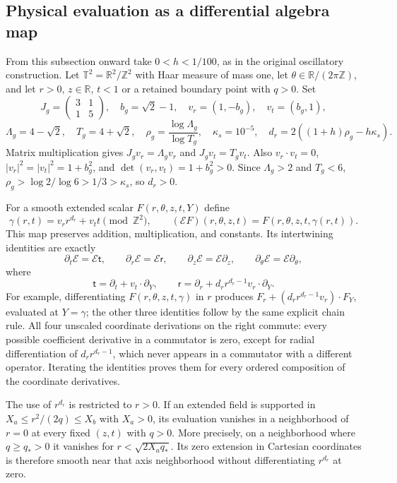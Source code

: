 \documentclass[10pt,a4paper]{article}
\begin{document}
\subsection{Physical evaluation as a differential algebra map}
From this subsection onward take $0<h<1/100$, as in the original
oscillatory construction.
Let $\mathbb T^2=\mathbb R^2/\mathbb Z^2$ with Haar measure of mass one,
let $\theta\in\mathbb R/(2\pi\mathbb Z)$, and let $r>0$, $z\in\mathbb R$,
$t<1$ or a retained boundary point with $q>0$.  Set
\[
 J_g=\begin{pmatrix}3&1\\1&5\end{pmatrix},\quad b_g=\sqrt2-1,
 \quad v_r=(1,-b_g),\quad v_t=(b_g,1),
\]
\[
 \Lambda_g=4-\sqrt2,\quad T_g=4+\sqrt2,
 \quad\rho_g=\frac{\log\Lambda_g}{\log T_g},\quad
 \kappa_s=10^{-5},\quad d_r=2((1+h)\rho_g-h\kappa_s).
\]
Matrix multiplication gives $J_gv_r=\Lambda_gv_r$ and
$J_gv_t=T_gv_t$.  Also
$v_r\cdot v_t=0$, $|v_r|^2=|v_t|^2=1+b_g^2$, and
$\det(v_r,v_t)=1+b_g^2>0$.  Since $\Lambda_g>2$ and $T_g<6$,
$\rho_g>\log2/\log6>1/3>\kappa_s$, so $d_r>0$.

For a smooth extended scalar $F(r,\theta,z,t,Y)$ define
\[
 \gamma(r,t)=v_rr^{d_r}+v_tt\pmod{\mathbb Z^2},\qquad
 (\mathcal EF)(r,\theta,z,t)=F(r,\theta,z,t,\gamma(r,t)).
\]
This map preserves addition, multiplication, and constants.  Its
intertwining identities are exactly
\[
 \partial_t\mathcal E=\mathcal E\mathsf t,\qquad
 \partial_r\mathcal E=\mathcal E\mathsf r,\qquad
 \partial_z\mathcal E=\mathcal E\partial_z,\qquad
 \partial_\theta\mathcal E=\mathcal E\partial_\theta,
\]
where
\[
 \mathsf t=\partial_t+v_t\cdot\partial_Y,\qquad
 \mathsf r=\partial_r+d_rr^{d_r-1}v_r\cdot\partial_Y.
\]
For example, differentiating $F(r,\theta,z,t,\gamma)$ in $r$ produces
$F_r+(d_rr^{d_r-1}v_r)\cdot F_Y$, evaluated at $Y=\gamma$; the other
three identities follow by the same explicit chain rule.  All four
unscaled coordinate derivations on the right commute: every possible
coefficient derivative in a commutator is zero, except for radial
differentiation of $d_rr^{d_r-1}$, which never appears in a commutator
with a different operator.  Iterating the identities proves them for
every ordered composition of the coordinate derivatives.

The use of $r^{d_r}$ is restricted to $r>0$.  If an extended field is
supported in $X_a\le r^2/(2q)\le X_b$ with $X_a>0$, its evaluation
vanishes in a neighborhood of $r=0$ at every fixed $(z,t)$ with $q>0$.
More precisely, on a neighborhood where $q\ge q_*>0$ it vanishes for
$r<\sqrt{2X_aq_*}$.  Its zero extension in Cartesian coordinates is
therefore smooth near that axis neighborhood without differentiating
$r^{d_r}$ at zero.
\end{document}
